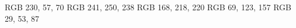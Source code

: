 
\usepackage{graphicx}
\usepackage{caption}

\usepackage{pgfplots,pgfplotstable}
\pgfplotsset{compat=newest}

\definecolor {imperialRed}  {RGB} {230,  57,  70}
\definecolor {honeydew}     {RGB} {241, 250, 238}
\definecolor {powderBlue}   {RGB} {168, 218, 220}
\definecolor {celadonBlue}  {RGB} { 69, 123, 157}
\definecolor {prussianBlue} {RGB} { 29,  53,  87}
